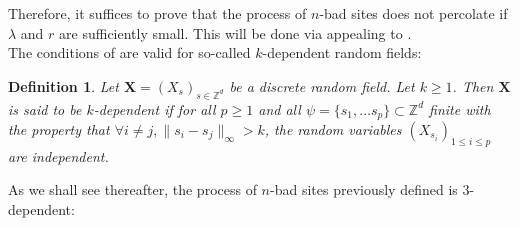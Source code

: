 \documentclass[10pt,a4paper]{amsart}
\theoremstyle{exampstyle}
\newtheorem{Definition}{Definition}
\theoremstyle{exampnotations}
\begin{document}
Therefore, it suffices to prove that the process of $n$-bad sites does not percolate if $\lambda$ and $r$ are sufficiently small. This will be done via appealing to \cite[Theorem 0.0]{liggett_domination_1997}. \\
The conditions of \cite[Theorem 0.0]{liggett_domination_1997} are valid for so-called $k$-dependent random fields:
\begin{Definition}
Let $ \mathbf{X}=(X_s)_{s \in \mathbb{Z}^{d}}$ be a discrete random field. Let $k \geq 1$. Then $\mathbf{X}$ is said to be $k$-dependent if for all $p \geq 1$ and all $\psi = \lbrace s_{1}, \ldots s_{p} \rbrace \subset \mathbb{Z}^{d}$ finite with the property that $\forall i \neq j, \lVert s_{i} - s_{j} \rVert_{\infty} > k $, the random variables $(X_{s_{i}})_{1 \leq i \leq p}$ are independent.
\end{Definition}

As we shall see thereafter, the process of $n$-bad sites previously defined is $3$-dependent:
\end{document}
